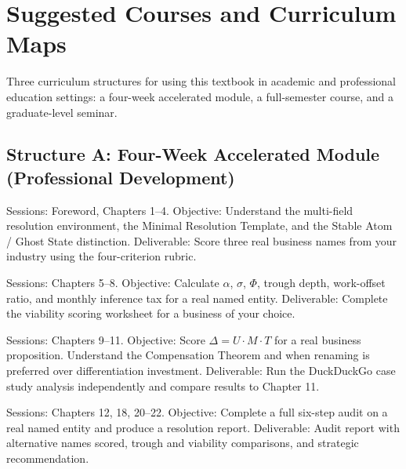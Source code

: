 \documentclass[12pt, openany]{book}
\theoremstyle{thmstyle}
\theoremstyle{defstyle}
\begin{document}
\chapter{Suggested Courses and Curriculum Maps}

\begin{appbox}[Purpose]
Three curriculum structures for using this textbook in academic and professional education settings: a four-week accelerated module, a full-semester course, and a graduate-level seminar.
\end{appbox}

\section*{Structure A: Four-Week Accelerated Module (Professional Development)}

\begin{description}[leftmargin=0em]
\item[\textbf{Week 1 --- The Resolution Framework}]
Sessions: Foreword, Chapters 1--4. Objective: Understand the multi-field resolution environment, the Minimal Resolution Template, and the Stable Atom / Ghost State distinction. Deliverable: Score three real business names from your industry using the four-criterion rubric.

\item[\textbf{Week 2 --- The Cost Variables}]
Sessions: Chapters 5--8. Objective: Calculate $\alpha$, $\sigma$, $\Phi$, trough depth, work-offset ratio, and monthly inference tax for a real named entity. Deliverable: Complete the viability scoring worksheet for a business of your choice.

\item[\textbf{Week 3 --- Differentiation and Compensation}]
Sessions: Chapters 9--11. Objective: Score $\Delta = U \cdot M \cdot T$ for a real business proposition. Understand the Compensation Theorem and when renaming is preferred over differentiation investment. Deliverable: Run the DuckDuckGo case study analysis independently and compare results to Chapter 11.

\item[\textbf{Week 4 --- Application}]
Sessions: Chapters 12, 18, 20--22. Objective: Complete a full six-step audit on a real named entity and produce a resolution report. Deliverable: Audit report with alternative names scored, trough and viability comparisons, and strategic recommendation.
\end{description}
\end{document}
